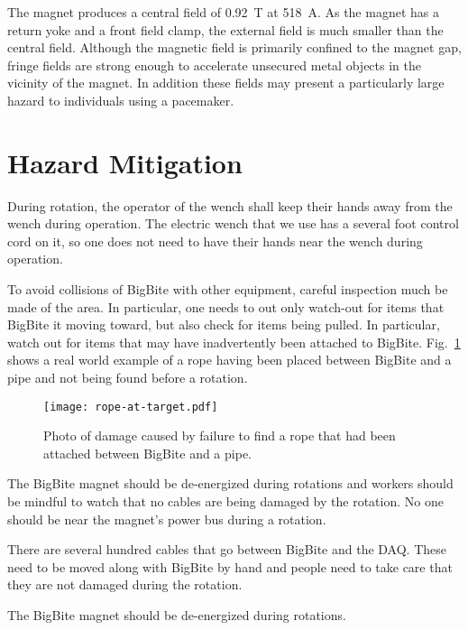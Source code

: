 	The magnet produces a central field of 0.92~T at 518~A.  
As the magnet has a return yoke and a front field clamp, the external field is much smaller 
than the central field.   Although the magnetic field is primarily confined to the magnet 
gap, fringe fields are strong enough to accelerate unsecured metal objects in the vicinity of
the magnet.  In addition these fields may present a particularly large hazard 
to individuals using a pacemaker.

\section{Hazard Mitigation}

During rotation, the operator of the wench shall keep their hands away from the wench during operation.
The electric wench that we use has a several foot control cord on it, so one does not need to have their
hands near the wench during operation.


To avoid collisions of BigBite with other equipment, careful inspection much be made of the area.
In particular, one needs to out only watch-out for items that BigBite it moving toward, but also check
for items being pulled.  In particular, watch out for items that may have inadvertently been attached to BigBite.
Fig.~\ref{rope-hazard} shows a real world example of a rope having been placed between BigBite and a pipe
and not being found before a rotation.

\begin{figure}[htb]
\texttt{[image: rope-at-target.pdf]}
\caption{Photo of damage caused by failure to find a rope that had been attached between BigBite
and a pipe.}
\label{rope-hazard}
\end{figure}

The BigBite magnet should be de-energized during rotations and workers should be mindful to watch that
no cables are being damaged by the rotation.  No one should be near the magnet's power bus during
a rotation.

There are several hundred cables that go between BigBite and the DAQ.  These need to be moved along with
BigBite by hand and people need to take care that they are not damaged during the rotation.

The BigBite magnet should be de-energized during rotations.

